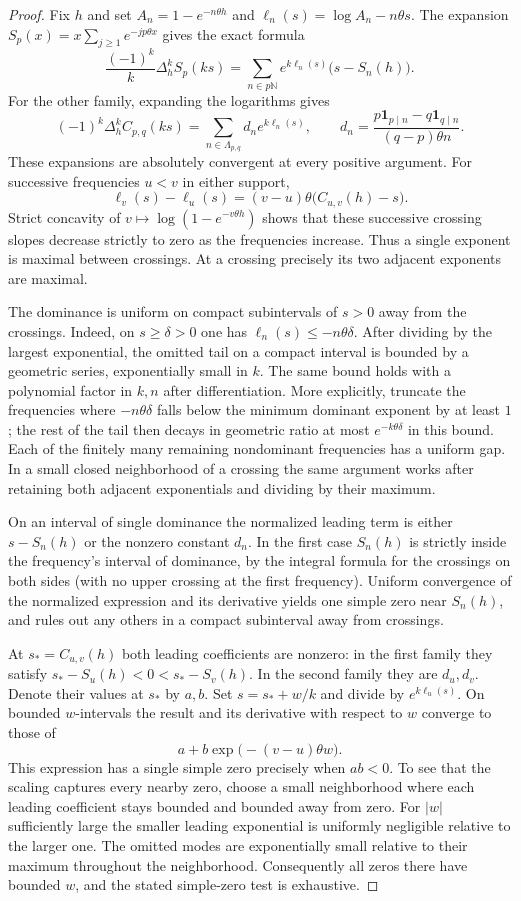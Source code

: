 \documentclass[11pt,a4paper]{article}
\theoremstyle{definition}\newtheorem{definition}[theorem]{Definition}\newtheorem{example}[theorem]{Example}
\theoremstyle{remark}\newtheorem{remark}[theorem]{Remark}
\begin{document}
\begin{proof}
Fix $h$ and set $A_n=1-e^{-n\theta h}$ and $\ell_n(s)=\log A_n-n\theta s$. The expansion $S_p(x)=x\sum_{j\ge1}e^{-jp\theta x}$ gives the exact formula
\[
 \frac{(-1)^k}{k}\Delta_h^k S_p(ks)
   =\sum_{n\in p\mathbb N}e^{k\ell_n(s)}\bigl(s-S_n(h)\bigr).
\]
For the other family, expanding the logarithms gives
\[
 (-1)^k\Delta_h^k C_{p,q}(ks)
   =\sum_{n\in\Lambda_{p,q}}d_n e^{k\ell_n(s)},\qquad
 d_n=\frac{p\mathbf 1_{p\mid n}-q\mathbf 1_{q\mid n}}
                  {(q-p)\theta n}.
\]
These expansions are absolutely convergent at every positive argument. For successive frequencies $u<v$ in either support,
\[
 \ell_v(s)-\ell_u(s)=(v-u)\theta\bigl(C_{u,v}(h)-s\bigr).
\]
Strict concavity of $v\mapsto\log(1-e^{-v\theta h})$ shows that these successive crossing slopes decrease strictly to zero as the frequencies increase. Thus a single exponent is maximal between crossings. At a crossing precisely its two adjacent exponents are maximal.

The dominance is uniform on compact subintervals of $s>0$ away from the crossings. Indeed, on $s\ge\delta>0$ one has $\ell_n(s)\le-n\theta\delta$. After dividing by the largest exponential, the omitted tail on a compact interval is bounded by a geometric series, exponentially small in $k$. The same bound holds with a polynomial factor in $k,n$ after differentiation. More explicitly, truncate the frequencies where $-n\theta\delta$ falls below the minimum dominant exponent by at least $1$; the rest of the tail then decays in geometric ratio at most $e^{-k\theta\delta}$ in this bound. Each of the finitely many remaining nondominant frequencies has a uniform gap. In a small closed neighborhood of a crossing the same argument works after retaining both adjacent exponentials and dividing by their maximum.

On an interval of single dominance the normalized leading term is either $s-S_n(h)$ or the nonzero constant $d_n$. In the first case $S_n(h)$ is strictly inside the frequency's interval of dominance, by the integral formula for the crossings on both sides (with no upper crossing at the first frequency). Uniform convergence of the normalized expression and its derivative yields one simple zero near $S_n(h)$, and rules out any others in a compact subinterval away from crossings.

At $s_*=C_{u,v}(h)$ both leading coefficients are nonzero: in the first family they satisfy $s_*-S_u(h)<0<s_*-S_v(h)$. In the second family they are $d_u,d_v$. Denote their values at $s_*$ by $a,b$. Set $s=s_*+w/k$ and divide by $e^{k\ell_u(s)}$. On bounded $w$-intervals the result and its derivative with respect to $w$ converge to those of
\[
 a+b\exp\bigl(-(v-u)\theta w\bigr).
\]
This expression has a single simple zero precisely when $ab<0$. To see that the scaling captures every nearby zero, choose a small neighborhood where each leading coefficient stays bounded and bounded away from zero. For $|w|$ sufficiently large the smaller leading exponential is uniformly negligible relative to the larger one. The omitted modes are exponentially small relative to their maximum throughout the neighborhood. Consequently all zeros there have bounded $w$, and the stated simple-zero test is exhaustive.


\end{proof}
\end{document}
